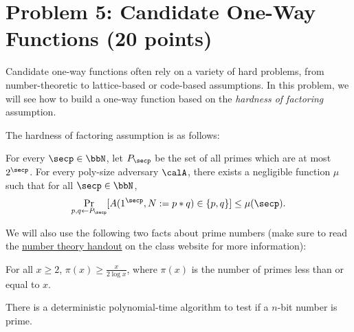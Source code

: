 \documentclass{article}
\begin{document}
\section*{Problem 5: Candidate One-Way Functions (20 points)}
Candidate one-way functions often rely on a variety of hard problems, from number-theoretic to lattice-based or code-based assumptions. In this problem, we will see how to build a one-way function based on the \emph{hardness of factoring} assumption.

The hardness of factoring assumption is as follows:
\begin{assumption}
    For every $\secp \in \bbN$, let $P_\secp$ be the set of all primes which are at most $2^\secp$. For every poly-size adversary $\calA$, there exists a negligible function $\mu$ such that for all $\secp \in \bbN$,
        \[ \Pr_{p, q \gets P_\secp}[A(1^{\secp}, N := p * q) \in \{p, q\}] \leq \mu(\secp). \]
\end{assumption}
We will also use the following two facts about prime numbers (make sure to read the \href{https://mit6875.github.io/HANDOUTS/numbertheory.pdf}{number theory handout} on the class website for more information):
\begin{theorem}
    For all $x \geq 2$, $\pi(x) \geq \frac{x}{2\log x}$, where $\pi(x)$ is the number of primes less than or equal to $x$.
\end{theorem}
\begin{theorem}
    There is a deterministic polynomial-time algorithm to test if a $n$-bit number is prime.
\end{theorem}
\newcommand{\mult}{\mathsf{mult}}
\end{document}
